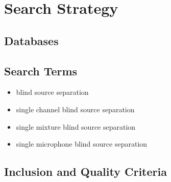 \documentclass[11pt, oneside, a4paper]{article}
\begin{document}
\section{Search Strategy}

\subsection{Databases}

\subsection{Search Terms}


\begin{itemize}
  \item blind source separation
  \item single channel blind source separation
  \item single mixture blind source separation
  \item single microphone blind source separation
\end{itemize}


\subsection{Inclusion and Quality Criteria}
\end{document}
